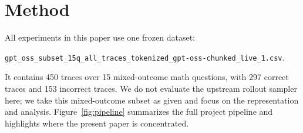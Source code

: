 \documentclass[11pt]{article}
\newcommand{\tok}[1]{\texttt{\small #1}}
\begin{document}
\section{Method}

All experiments in this paper use one frozen dataset:
\begin{center}
\tok{gpt\_oss\_subset\_15q\_all\_traces\_tokenized\_gpt-oss-chunked\_live\_1.csv}.
\end{center}
It contains 450 traces over 15 mixed-outcome math questions, with 297 correct traces and 153 incorrect traces. We do not evaluate the upstream rollout sampler here; we take this mixed-outcome subset as given and focus on the representation and analysis. Figure~\ref{fig:pipeline} summarizes the full project pipeline and highlights where the present paper is concentrated.
\end{document}
